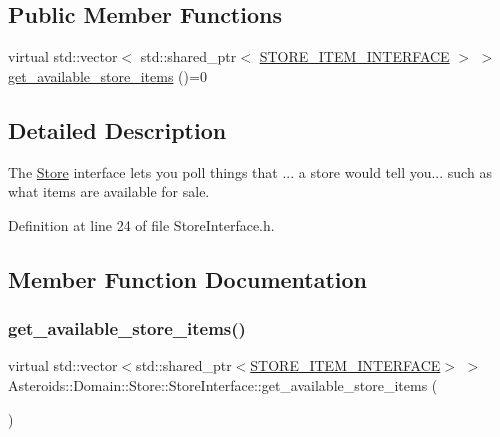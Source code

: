 \subsection*{Public Member Functions}
\begin{DoxyCompactItemize}
\item 
virtual std\+::vector$<$ std\+::shared\+\_\+ptr$<$ \hyperlink{classAsteroids_1_1Domain_1_1Store_1_1STORE__ITEM__INTERFACE}{S\+T\+O\+R\+E\+\_\+\+I\+T\+E\+M\+\_\+\+I\+N\+T\+E\+R\+F\+A\+CE} $>$ $>$ \hyperlink{classAsteroids_1_1Domain_1_1Store_1_1StoreInterface_a26cad8caa421c12c061132691df3f15d}{get\+\_\+available\+\_\+store\+\_\+items} ()=0
\end{DoxyCompactItemize}


\subsection{Detailed Description}
The \hyperlink{classAsteroids_1_1Domain_1_1Store_1_1Store}{Store} interface lets you poll things that ... a store would tell you... such as what items are available for sale. 

Definition at line 24 of file Store\+Interface.\+h.



\subsection{Member Function Documentation}
\mbox{\label{classAsteroids_1_1Domain_1_1Store_1_1StoreInterface_a26cad8caa421c12c061132691df3f15d}} 
\subsubsection{\texorpdfstring{get\+\_\+available\+\_\+store\+\_\+items()}{get\_available\_store\_items()}}
{\footnotesize\ttfamily virtual std\+::vector$<$std\+::shared\+\_\+ptr$<$\hyperlink{classAsteroids_1_1Domain_1_1Store_1_1STORE__ITEM__INTERFACE}{S\+T\+O\+R\+E\+\_\+\+I\+T\+E\+M\+\_\+\+I\+N\+T\+E\+R\+F\+A\+CE}$>$ $>$ Asteroids\+::\+Domain\+::\+Store\+::\+Store\+Interface\+::get\+\_\+available\+\_\+store\+\_\+items (\begin{DoxyParamCaption}{ }\end{DoxyParamCaption})\hspace{0.3cm}{\ttfamily [pure virtual]}}



